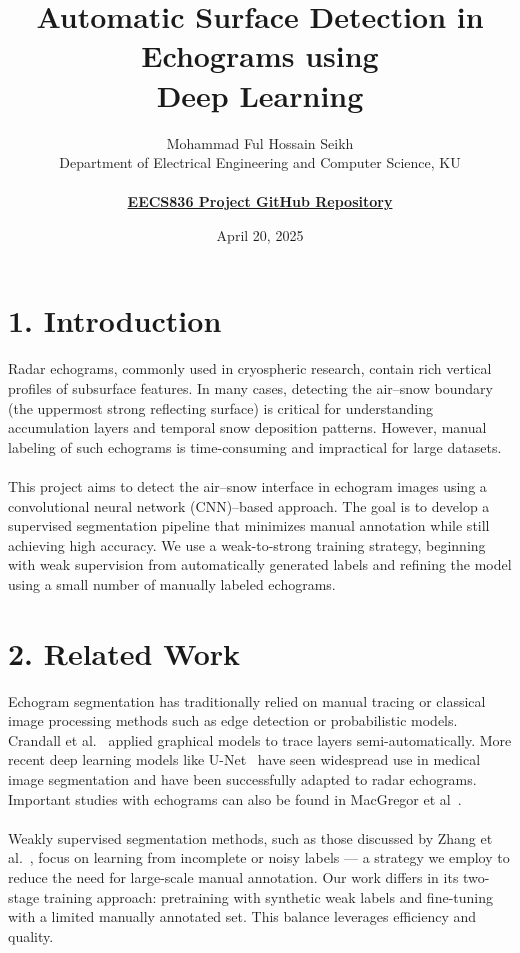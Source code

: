 \documentclass[11pt,oneside,openany]{article}
\title{\textbf{Automatic Surface Detection in Echograms using\\ Deep Learning}}
\author{Mohammad Ful Hossain Seikh\\
Department of Electrical Engineering and Computer Science, KU\\\\
\href{https://github.com/Mohammad-Neutrino/EECS836_Machine_Learning/tree/trunk/Project}{\textbf{EECS836 Project GitHub Repository}}}
\date{April 20, 2025}
\begin{document}
\maketitle

\section*{1. Introduction}
Radar echograms, commonly used in cryospheric research, contain rich vertical profiles of subsurface features. In many cases, detecting the air–snow boundary (the uppermost strong reflecting surface) is critical for understanding accumulation layers and temporal snow deposition patterns. However, manual labeling of such echograms is time-consuming and impractical for large datasets.\\\\
This project aims to detect the air–snow interface in echogram images using a convolutional neural network (CNN)–based approach. The goal is to develop a supervised segmentation pipeline that minimizes manual annotation while still achieving high accuracy. We use a weak-to-strong training strategy, beginning with weak supervision from automatically generated labels and refining the model using a small number of manually labeled echograms.

\section*{2. Related Work}
Echogram segmentation has traditionally relied on manual tracing or classical image processing methods such as edge detection or probabilistic models. Crandall et al.~\cite{2} applied graphical models to trace layers semi-automatically. More recent deep learning models like U-Net~\cite{1} have seen widespread use in medical image segmentation and have been successfully adapted to radar echograms. Important studies with echograms can also be found in MacGregor et al~\cite{4}.\\\\
Weakly supervised segmentation methods, such as those discussed by Zhang et al.~\cite{3}, focus on learning from incomplete or noisy labels — a strategy we employ to reduce the need for large-scale manual annotation. Our work differs in its two-stage training approach: pretraining with synthetic weak labels and fine-tuning with a limited manually annotated set. This balance leverages efficiency and quality.
\end{document}
